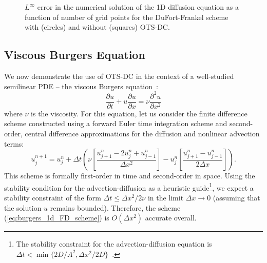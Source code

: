 \documentclass[fleqn,12pt,twoside]{article}
\newcommand{\beq}{\begin{equation}}
\newcommand{\eeq}{\end{equation}}
\def\pt{\partial t}
\def\px{\partial x}
\def\dt{\Delta t}
\def\dx{\Delta x}
\begin{document}
\begin{figure}[tb]
\begin{center}
\caption{$L^\infty$ error in the numerical solution of the 1D diffusion 
equation as a function of number of grid points for the DuFort-Frankel scheme 
with (circles) and without (squares) OTS-DC.
}
\label{fig:diffusion_eqn_1d_dufort_frankel_error} 
\end{center}
\end{figure}



\subsection{Viscous Burgers Equation}
We now demonstrate the use of OTS-DC in the context of a well-studied
semilinear PDE -- the viscous Burgers equation~\cite{whitham_book}:
\beq
  \frac{\partial u}{\pt} + u \frac{\partial u}{\px} = 
     \nu \frac{\partial^2 u}{\px^2} 
  \label{eq:burgers_1d}
\eeq
where $\nu$ is the viscosity.  For this equation, let us consider the finite
difference scheme constructed using a forward Euler time integration scheme
and second-order, central difference approximations for the diffusion and 
nonlinear advection terms:
\beq
  u^{n+1}_j = u^{n}_j 
  + \dt 
    \left( \nu 
      \left [ \frac{u^{n}_{j+1} -2 u^{n}_j + u^{n}_{j-1}}{\dx^2} \right]
         - u^n_j 
      \left[ \frac{u^{n}_{j+1} - u^{n}_{j-1}}{2 \dx} \right] 
    \right).
  \label{eq:burgers_1d_FD_scheme}
\eeq
This scheme is formally first-order in time and second-order in space.  
Using the stability condition for the advection-diffusion as a heuristic 
guide\footnote{The stability constraint for the advection-diffusion equation
is $\dt < \min \{2D/A^2, \dx^2/2D \}$~\cite{chan_1984}.}, 
we expect a stability constraint of the form $\dt \le \dx^2/2 \nu$ in the 
limit $\dx \rightarrow 0$ (assuming that the solution $u$ remains bounded).  
Therefore, the scheme (\ref{eq:burgers_1d_FD_scheme}) is $O(\dx^2)$ accurate 
overall. 
\end{document}
